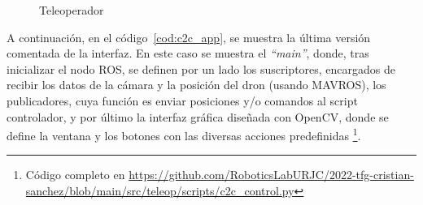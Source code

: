 \begin{figure} [t]
	\centering
	\quad
    \quad
	\caption{Teleoperador}
	\label{fig:teleop_figs}
\end{figure}

A continuación, en el código~\ref{cod:c2c_app}, se muestra la última versión comentada de la interfaz. En este caso se muestra el \emph{``main''}, donde, tras inicializar el nodo \ac{ROS}, se definen por un lado los suscriptores, encargados de recibir los datos de la cámara y la posición del dron (usando MAVROS), los publicadores, cuya función es enviar posiciones y/o comandos al script controlador, y por último la interfaz gráfica diseñada con OpenCV, donde se define la ventana y los botones con las diversas acciones predefinidas \footnote{Código completo en \url{https://github.com/RoboticsLabURJC/2022-tfg-cristian-sanchez/blob/main/src/teleop/scripts/c2c_control.py}}.\\

